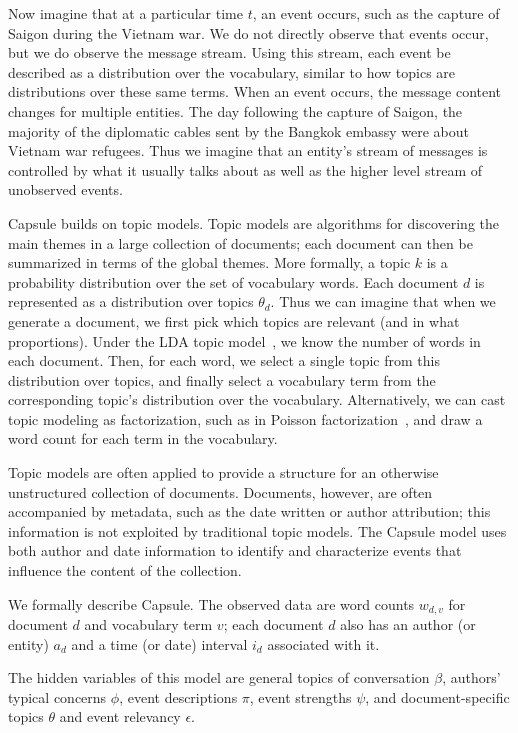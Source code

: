 Now imagine that at a particular time $t$, an event occurs, such as the capture of Saigon during the Vietnam war.  We do not directly observe that events occur, but we do observe the message stream.  Using this stream, each event be described as a distribution over the vocabulary, similar to how topics are distributions over these same terms.  When an event occurs, the message content changes for multiple entities. The day following the capture of Saigon, the majority of the diplomatic cables sent by the Bangkok embassy were about Vietnam war refugees.
Thus we imagine that an entity's stream of messages is controlled by what it usually talks about as well as the higher level stream of unobserved events.

 Capsule builds on topic models.  Topic models are algorithms for discovering the main themes in a large collection of documents; each document can then be summarized in terms of the global themes.  More formally, a topic $k$ is a probability distribution over the set of vocabulary words.  Each document $d$ is represented as a distribution over topics $\theta_d$.  Thus we can imagine that when we generate a document, we first pick which topics are relevant (and in what proportions).  Under the LDA topic model~\cite{Blei:2003}, we know the number of words in each document.  Then, for each word, we select a single topic from this distribution over topics, and finally select a vocabulary term from the corresponding topic's distribution over the vocabulary.  Alternatively, we can cast topic modeling as factorization, such as in Poisson factorization~\cite{Gopalan:2014b}, and draw a word count for each term in the vocabulary.

Topic models are often applied to provide a structure for an otherwise unstructured collection of documents.  Documents, however, are often accompanied by metadata, such as the date written or author attribution; this information is not exploited by traditional topic models.  The Capsule model uses both author and date information to identify and characterize events that influence the content of the collection.

We formally describe Capsule. The observed data are word counts $w_{d,v}$ for document $d$ and vocabulary term $v$; each document $d$ also has an author (or entity) $a_d$ and a time (or date) interval $i_d$ associated with it.

The hidden variables of this model are general topics of conversation $\beta$, authors' typical concerns $\phi$, event descriptions $\pi$, event strengths $\psi$, and document-specific topics $\theta$ and event relevancy $\epsilon$.  %

